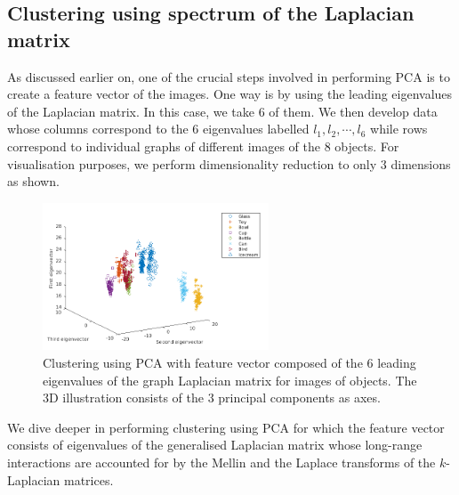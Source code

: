 \documentclass[10pt,a4paper]{article}
\theoremstyle{plain}
\theoremstyle{definition}
\begin{document}
\subsection{Clustering using spectrum of the Laplacian matrix}
As discussed earlier on, one of the crucial steps involved in performing PCA is to create a feature vector of the images. One way is by using the leading eigenvalues of the Laplacian matrix. In this case, we take $6$ of them. We then develop data whose columns correspond to the  $6$ eigenvalues labelled $l_1,l_2,\cdots,l_6$  while rows correspond to individual graphs of different images of the $8$ objects. For visualisation purposes, we perform dimensionality reduction to only $3$ dimensions as shown.
\begin{figure}[H]
	\centering
	\includegraphics[width=0.6\textwidth]{images/No-longrange.png}
	\caption{Clustering using PCA with feature vector composed of the $6$ leading eigenvalues of the graph Laplacian matrix for images of objects. The $3$D illustration consists of the $3$ principal components as axes.}
	\label{}
\end{figure}

We dive deeper in performing clustering using PCA for which the feature vector consists of eigenvalues of the generalised Laplacian matrix whose long-range interactions are accounted for by the Mellin and the Laplace transforms of the $k$-Laplacian matrices.
\end{document}
